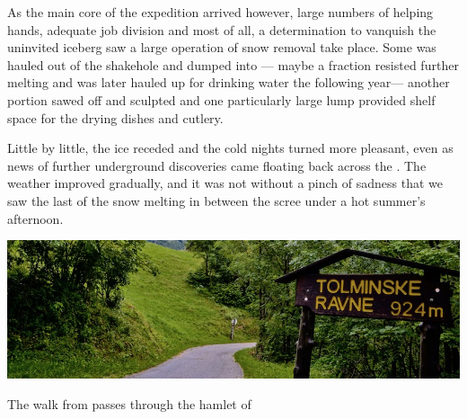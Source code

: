 As the main core of the expedition arrived however, large numbers of helping hands, adequate job division and most of all, a determination to vanquish the uninvited iceberg saw a large operation of snow removal take place. Some was hauled out of the shakehole and dumped into  --- maybe a fraction resisted further melting and was later hauled up for drinking water the following year--- another portion sawed off and sculpted and one particularly large lump provided shelf space for the drying dishes and cutlery.

Little by little, the ice receded and the cold  nights turned more pleasant, even as news of further underground discoveries came floating back across the . The weather improved gradually, and it was not without a pinch of sadness that we saw the last of the snow melting in between the scree under a hot summer's afternoon.


\begin{pagefigure}
\checkoddpage \ifoddpage \forcerectofloat \else \forceversofloat \fi
   \centering
\includegraphics[width = \textwidth]{images/2014/welcome-2014/DSC_1201.jpg}
\caption{The walk from \protect{} passes through the hamlet of \protect{} } \label{fig:ravne_sign}
\end{pagefigure}

